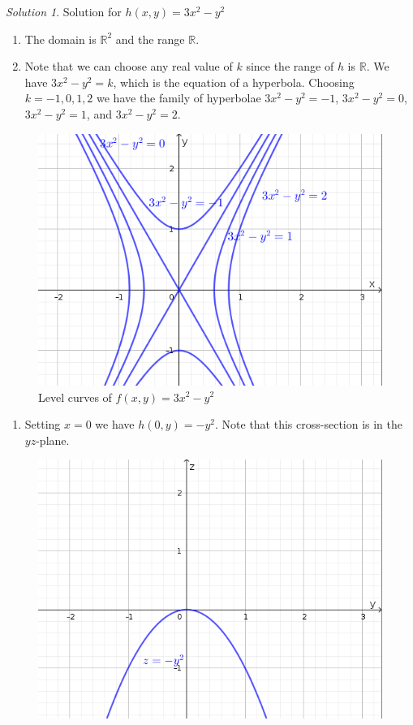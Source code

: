 \documentclass[
]{book}
\providecommand{\tightlist}{%
  \setlength{\itemsep}{0pt}\setlength{\parskip}{0pt}}
\theoremstyle{definition}
\theoremstyle{definition}
\theoremstyle{definition}
\theoremstyle{definition}
\theoremstyle{remark}
\newtheorem*{solution}{Solution}
\begin{document}
\begin{solution}

Solution for \(h(x,y)=3x^2-y^2\)

\begin{enumerate}
\def\labelenumi{\alph{enumi}.}
\item
  The domain is \(\mathbb{R}^2\) and the range \(\mathbb{R}\).
\item
  Note that we can choose any real value of \(k\) since the range of \(h\) is \(\mathbb{R}\). We have \(3x^2-y^2=k\), which is the equation of a hyperbola. Choosing \(k=-1,0,1,2\) we have the family of hyperbolae \(3x^2-y^2=-1\), \(3x^2-y^2=0\), \(3x^2-y^2=1\), and \(3x^2-y^2=2\).
\end{enumerate}

\begin{figure}

{\centering \includegraphics[width=0.5\linewidth]{images/lc-h} 

}

\caption{Level curves of $f(x,y)=3x^2-y^2$}\label{fig:unnamed-chunk-7}
\end{figure}

\begin{enumerate}
\def\labelenumi{\alph{enumi}.}
\setcounter{enumi}{2}
\tightlist
\item
  Setting \(x=0\) we have \(h(0,y)=-y^2\). Note that this cross-section is in the \(yz\)-plane.
\end{enumerate}

\begin{figure}

{\centering \includegraphics[width=0.5\linewidth]{images/x0-h} 

}
\end{figure}
\end{solution}
\end{document}
